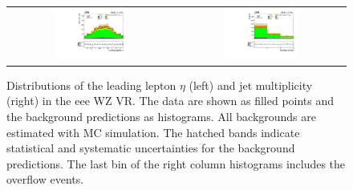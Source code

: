 \begin{figure}[tbh!]
 \begin{center}
 \begin{tabular}{cc}
 \includegraphics[width=0.45\textwidth]{figures/Part3/Selection/WZ/eee/lep1Eta}&
 \includegraphics[width=0.45\textwidth]{figures/Part3/Selection/WZ/eee/njet} \\
 \end{tabular}
 \caption{Distributions of the leading lepton $\eta$ (left) and jet multiplicity (right) in the eee WZ VR. The data are shown as filled points and the background predictions as histograms. All backgrounds are estimated with \ac{MC} simulation. The hatched bands indicate statistical and systematic uncertainties for the background predictions. The last bin of the right column histograms includes the overflow events.}
 \label{fig:WZ_eee}
 \end{center}
\end{figure}

